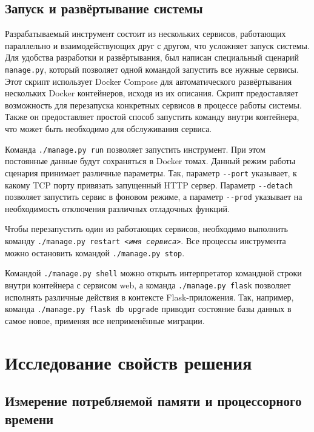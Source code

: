 \documentclass[a4paper,article,14pt]{extarticle}
\begin{document}
\subsection{Запуск и развёртывание системы}

Разрабатываемый инструмент состоит из нескольких сервисов, работающих параллельно и взаимодействующих друг с другом, что усложняет запуск системы. Для удобства разработки и развёртывания, был написан специальный сценарий \texttt{manage.py}, который позволяет одной командой запустить все нужные сервисы. Этот скрипт использует Docker Compose\cite{dockercompose} для автоматического развёртывания нескольких Docker контейнеров, исходя из их описания. Скрипт предоставляет возможность для перезапуска конкретных сервисов в процессе работы системы. Также он предоставляет простой способ запустить команду внутри контейнера, что может быть необходимо для обслуживания сервиса.

Команда \texttt{./manage.py run} позволяет запустить инструмент. При этом постоянные данные будут сохраняться в Docker томах. Данный режим работы сценария принимает различные параметры. Так, параметр \texttt{-{}-port} указывает, к какому TCP порту привязать запущенный HTTP сервер. Параметр \texttt{-{}-detach} позволяет запустить сервис в фоновом режиме, а параметр \texttt{-{}-prod} указывает на необходимость отключения различных отладочных функций.

Чтобы перезапустить один из работающих сервисов, необходимо выполнить команду \texttt{./manage.py restart \textit{<имя сервиса>}}. Все процессы инструмента можно остановить командой \texttt{./manage.py stop}.

Командой \texttt{./manage.py shell} можно открыть интерпретатор командной строки внутри контейнера с сервисом web, а команда \texttt{./manage.py flask} позволяет исполнять различные действия в контексте Flask-приложения. Так, например, команда \texttt{./manage.py flask db upgrade} приводит состояние базы данных в самое новое, применяя все неприменённые миграции.

\pagebreak
\section{Исследование свойств решения}

\subsection{Измерение потребляемой памяти и процессорного времени}
\end{document}
